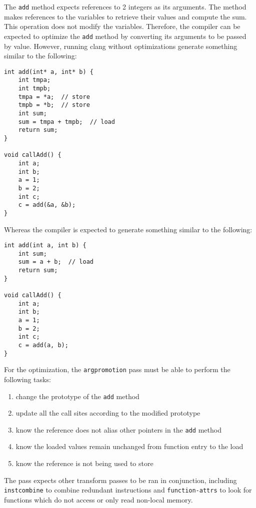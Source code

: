\documentclass[titlepage]{article}
\begin{document}
The \texttt{add} method expects references to 2 integers as its arguments. The method makes references to the variables to retrieve their values and compute the sum. This operation does not modify the variables. Therefore, the compiler can be expected to optimize the \texttt{add} method by converting its arguments to be passed by value. However, running clang without optimizations
generate something similar to the following:

\begin{lstlisting}[caption=\texttt{add} method compiled without optimizations,style=customC++]
int add(int* a, int* b) {
    int tmpa;
    int tmpb;
    tmpa = *a;  // store
    tmpb = *b;  // store
    int sum;
    sum = tmpa + tmpb;  // load
    return sum;
}

void callAdd() {
    int a;
    int b;
    a = 1;
    b = 2;
    int c;
    c = add(&a, &b);
}
\end{lstlisting}

Whereas the compiler is expected to generate something similar to the following:

\begin{lstlisting}[caption=Expected \texttt{add} method compiled with optimizations,style=customC++]
int add(int a, int b) {
    int sum;
    sum = a + b;  // load
    return sum;
}

void callAdd() {
    int a;
    int b;
    a = 1;
    b = 2;
    int c;
    c = add(a, b);
}
\end{lstlisting}

For the optimization, the \texttt{argpromotion} pass must be able to perform the following tasks:
\begin{enumerate}
    \item change the prototype of the \texttt{add} method
    \item update all the call sites according to the modified prototype
    \item know the reference does not alias other pointers in the \texttt{add} method
    \item know the loaded values remain unchanged from function entry to the load
    \item know the reference is not being used to store
\end{enumerate}

The pass expects other transform passes to be ran in conjunction, including \texttt{instcombine} to combine redundant instructions and \texttt{function-attrs} to look for functions which do not access or only read non-local memory.\cite{passes}
\end{document}
